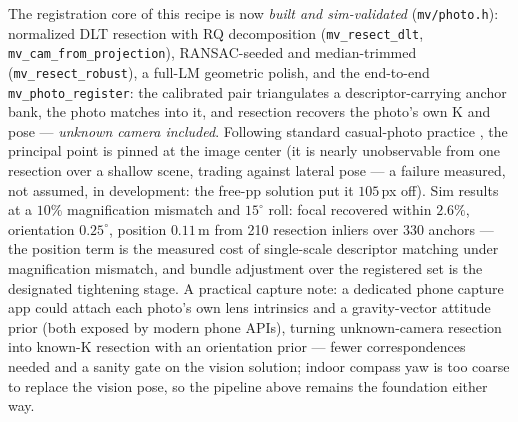 \documentclass[11pt]{article}
\theoremstyle{definition}
\newcommand{\code}[1]{\texttt{#1}}
\begin{document}
The registration core of this recipe is now \emph{built and
sim-validated} (\code{mv/photo.h}): normalized DLT resection with RQ
decomposition (\code{mv\_resect\_dlt},
\code{mv\_cam\_from\_projection}), RANSAC-seeded and
median-trimmed (\code{mv\_resect\_robust}), a full-LM geometric
polish, and the end-to-end \code{mv\_photo\_register}: the
calibrated pair triangulates a descriptor-carrying anchor bank, the
photo matches into it, and resection recovers the photo's own K and
pose --- \emph{unknown camera included}. Following standard
casual-photo practice \cite{Snavely2006}, the principal point is
pinned at the image center (it is nearly unobservable from one
resection over a shallow scene, trading against lateral pose --- a
failure measured, not assumed, in development: the free-pp solution
put it $105$\,px off). Sim results at a $10\%$ magnification
mismatch and $15^\circ$ roll: focal recovered within $2.6\%$,
orientation $0.25^\circ$, position $0.11$\,m from 210 resection
inliers over 330 anchors — the position term is the measured cost of
single-scale descriptor matching under magnification mismatch, and
bundle adjustment over the registered set is the designated
tightening stage. A practical capture note: a dedicated phone capture
app could attach each photo's own lens intrinsics and a
gravity-vector attitude prior (both exposed by modern phone APIs),
turning unknown-camera resection into known-K resection with an
orientation prior --- fewer correspondences needed and a sanity gate
on the vision solution; indoor compass yaw is too coarse to replace
the vision pose, so the pipeline above remains the foundation either
way.
\end{document}
